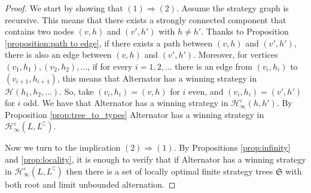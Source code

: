 \begin{proof}
We start by showing that $(1) \Rightarrow (2)$. Assume the strategy graph is recursive. This means that there exists a strongly connected component that contains two nodes $(v, h)$ and $(v', h')$ with $h \neq h'$. 
Thanks to Proposition \ref{proposition:path to edge}, if there exists a path between $(v, h)$ and $(v', h')$, there is also an edge between $(v, h)$ and $(v', h')$. 
Moreover, for vertices $(v_1,h_1),(v_2,h_2),\dots$, if for every $i=1,2,\dots$ there is an edge from $(v_i, h_i)$ to $(v_{i+1}, h_{i+1})$, this means that Alternator has a winning strategy in $\mathcal{H}(h_1,h_2,\dots)$. So, take $(v_i, h_i)= (v,h)$ for $i$ even, and $(v_i, h_i)= (v',h')$ for $i$ odd. We have that Alternator has a winning strategy in $\mathcal{H}^\varepsilon_\infty(h, h')$. By Proposition \ref{prop:tree_to_types}
Alternator has a winning strategy in  $\mathcal{H}^\varepsilon_\infty(L, L^\complement)$.


Now we turn to the implication  $(2) \Rightarrow (1)$. 
By Propositions \ref{prop:infinity}  and \ref{prop:locality}, it is enough to verify that 
 if Alternator has a winning strategy in $\mathcal{H}^\varepsilon_\infty(L, L^\complement)$ then there is a set of locally optimal finite strategy trees $\mathfrak{S}$ with both root and limit unbounded alternation. 
 

\end{proof}
